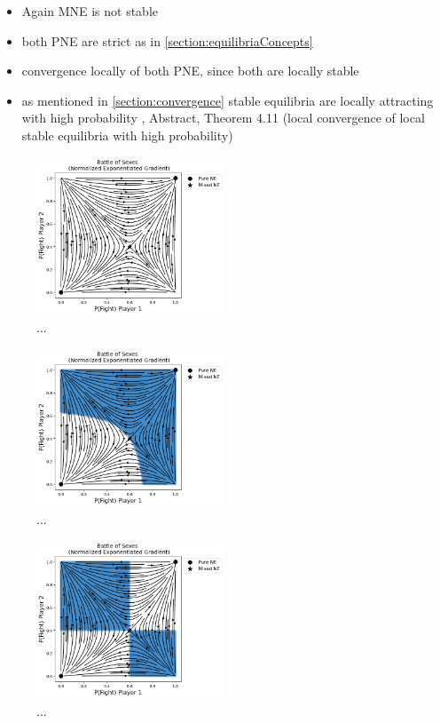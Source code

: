 \begin{itemize}
    \item Again MNE is not stable
    \item both PNE are strict as in \ref{section:equilibriaConcepts}
    \item convergence locally of both PNE, since both are locally stable
    \item as mentioned in \ref{section:convergence} stable equilibria are locally attracting with high probability \cite{mertikopoulos}, Abstract, Theorem 4.11 (local convergence of local stable equilibria with high probability) 
\end{itemize}

\begin{figure}
    \centering
    \includegraphics[width=0.5\textwidth]{logos/BattleOfSexes1.png}
    \caption{...}
    \label{BattleOfSexes1}
\end{figure}

\begin{figure}
    \centering
    \includegraphics[width=0.5\textwidth]{logos/BattleOfSexes2.png}
    \caption{...}
    \label{BattleOfSexes2}
\end{figure}

\begin{figure}
    \centering
    \includegraphics[width=0.5\textwidth]{logos/BattleOfSexes3.png}
    \caption{...}
    \label{BattleOfSexes3}
\end{figure}

